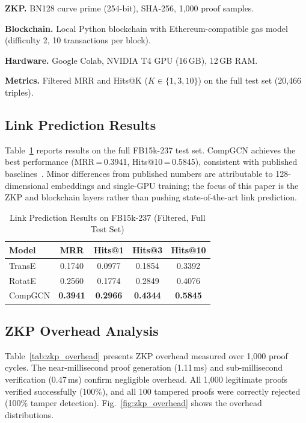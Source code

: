 \documentclass[runningheads]{llncs}
\begin{document}
\textbf{ZKP.} BN128 curve prime (254-bit), SHA-256, 1,000 proof samples.

\textbf{Blockchain.} Local Python blockchain with Ethereum-compatible gas model (difficulty 2, 10 transactions per block).

\textbf{Hardware.} Google Colab, NVIDIA T4 GPU (16\,GB), 12\,GB RAM.

\textbf{Metrics.} Filtered MRR and Hits@K ($K \in \{1, 3, 10\}$) on the full test set (20,466 triples).

\subsection{Link Prediction Results}

Table~\ref{tab:link_prediction} reports results on the full FB15k-237 test set. CompGCN achieves the best performance (MRR\,=\,0.3941, Hits@10\,=\,0.5845), consistent with published baselines~\cite{vashishth2020composition}. Minor differences from published numbers are attributable to 128-dimensional embeddings and single-GPU training; the focus of this paper is the ZKP and blockchain layers rather than pushing state-of-the-art link prediction.

\begin{table}[t]
\centering
\caption{Link Prediction Results on FB15k-237 (Filtered, Full Test Set)}
\label{tab:link_prediction}
\begin{tabular}{lcccc}
\toprule
\textbf{Model} & \textbf{MRR} & \textbf{Hits@1} & \textbf{Hits@3} & \textbf{Hits@10} \\
\midrule
TransE  & 0.1740 & 0.0977 & 0.1854 & 0.3392 \\
RotatE  & 0.2560 & 0.1774 & 0.2849 & 0.4076 \\
CompGCN & \textbf{0.3941} & \textbf{0.2966} & \textbf{0.4344} & \textbf{0.5845} \\
\bottomrule
\end{tabular}
\end{table}

\subsection{ZKP Overhead Analysis}

Table~\ref{tab:zkp_overhead} presents ZKP overhead measured over 1,000 proof cycles. The near-millisecond proof generation (1.11\,ms) and sub-millisecond verification (0.47\,ms) confirm negligible overhead. All 1,000 legitimate proofs verified successfully (100\%), and all 100 tampered proofs were correctly rejected (100\% tamper detection). Fig.~\ref{fig:zkp_overhead} shows the overhead distributions.
\end{document}
